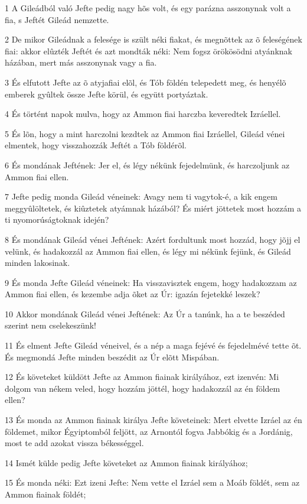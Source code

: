 \par 1 A Gileádból való Jefte pedig nagy hõs volt, és egy parázna asszonynak volt a fia, s Jeftét Gileád nemzette.
\par 2 De mikor Gileádnak a felesége is szült néki fiakat, és megnõttek az õ feleségének fiai: akkor elûzték Jeftét és azt mondták néki: Nem fogsz örökösödni atyánknak házában, mert más asszonynak vagy a fia.
\par 3 És elfutott Jefte az õ atyjafiai elõl, és Tób földén telepedett meg, és henyélõ emberek gyûltek össze Jefte körül, és együtt portyáztak.
\par 4 És történt napok mulva, hogy az Ammon fiai harczba keveredtek Izráellel.
\par 5 És lõn, hogy a mint harczolni kezdtek az Ammon fiai Izráellel, Gileád vénei elmentek, hogy visszahozzák Jeftét a Tób földérõl.
\par 6 És mondának Jeftének: Jer el, és légy nékünk fejedelmünk, és harczoljunk az Ammon fiai ellen.
\par 7 Jefte pedig monda Gileád véneinek: Avagy nem ti vagytok-é, a kik engem meggyûlöltetek, és kiûztetek atyámnak házából? És miért jöttetek most hozzám a ti nyomorúságtoknak idején?
\par 8 És mondának Gileád vénei Jeftének: Azért fordultunk most hozzád, hogy jõjj el velünk, és hadakozzál az Ammon fiai ellen, és légy mi nékünk fejünk, és Gileád minden lakosinak.
\par 9 És monda Jefte Gileád véneinek: Ha visszavisztek engem, hogy hadakozzam az Ammon fiai ellen, és kezembe adja õket az Úr: igazán fejetekké leszek?
\par 10 Akkor mondának Gileád vénei Jeftének: Az Úr a tanúnk, ha a te beszéded szerint nem cselekeszünk!
\par 11 És elment Jefte Gileád véneivel, és a nép a maga fejévé és fejedelmévé tette õt. És megmondá Jefte minden beszédit az Úr elõtt Mispában.
\par 12 És követeket küldött Jefte az Ammon fiainak királyához, ezt izenvén: Mi dolgom van nékem veled, hogy hozzám jöttél, hogy hadakozzál az én földem ellen?
\par 13 És monda az Ammon fiainak királya Jefte követeinek: Mert elvette Izráel az én földemet, mikor Égyiptomból feljött, az Arnontól fogva Jabbókig és a Jordánig, most te add azokat vissza békességgel.
\par 14 Ismét külde pedig Jefte követeket az Ammon fiainak királyához;
\par 15 És monda néki: Ezt izeni Jefte: Nem vette el Izráel sem a Moáb földét, sem az Ammon fiainak földét;
